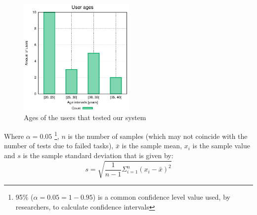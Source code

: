 \begin{figure}
  \centering
  \includegraphics[width=0.5\textwidth]{stats/user_ages.eps}
  \caption{Ages of the users that tested our system}
  \label{fig:user_ages}
\end{figure}


Where $\alpha=0.05$ \footnote{95\% ($\alpha=0.05=1-0.95$) is a common confidence level value used, by researchers, to calculate confidence intervals}, $n$ is the number of samples (which may not coincide with the number of tests due to failed tasks), $\bar{x}$ is the sample mean, $x_i$ is the sample value and $s$ is the sample standard deviation that is given by:
\begin{equation}
s=\sqrt{\frac{1}{n-1}\Sigma^{n}_{i=1}(x_i-\bar{x})^2}
\end{equation}





